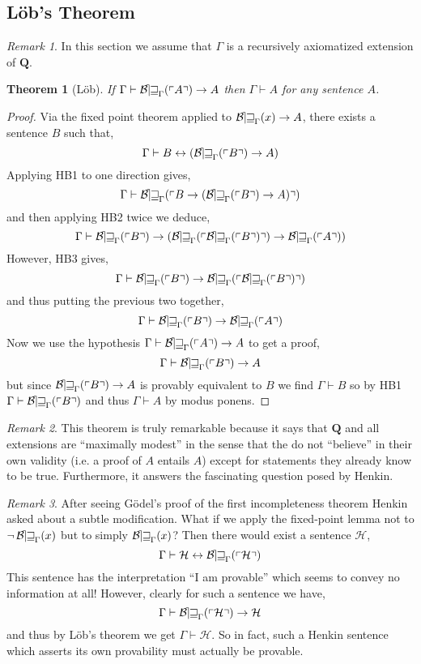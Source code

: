 \documentclass[12pt, leqno]{article}
\renewcommand{\bf}[1]{\mathbf{#1}}
\newcommand{\proves}{\vdash}
\theoremstyle{theorem}
\newtheorem{theorem}{Theorem}[section]
\theoremstyle{definition}
\theoremstyle{definition}
\theoremstyle{remark}
\theoremstyle{definition}
\theoremstyle{remark}
\newtheorem{remark}{Remark}[subsection]
\DeclareMathOperator{\Bew}{\mathcal{B\mkern-2.0mu e\mkern-2.0mu w\mkern-1mu}}
\begin{document}
\subsection{L\"{o}b's Theorem}

\begin{remark}
In this section we assume that $\Gamma$ is a recursively axiomatized extension of $\bf{Q}$. 
\end{remark}

\begin{theorem}[L\"{o}b]
If $\Gamma \proves \Thm{A} \to A$ then $\Gamma \proves A$ for any sentence $A$.
\end{theorem}

\begin{proof}
Via the fixed point theorem applied to $\Bew_{\Gamma}(x) \to A$, there exists a sentence $B$ such that,
\[ \Gamma \proves B \leftrightarrow (\Thm{B} \to A) \]
Applying HB1 to one direction gives,
\[ \Gamma \proves \Thm{B \to (\Thm{B} \to A)} \]
and then applying HB2 twice we deduce,
\[ \Gamma \proves \Thm{B} \to (\Thm{\Thm{B}} \to \Thm{A}) \]
However, HB3 gives, 
\[ \Gamma \proves \Thm{B} \to \Thm{\Thm{B}} \]
and thus putting the previous two together,
\[ \Gamma \proves \Thm{B} \to \Thm{A} \]
Now we use the hypothesis $\Gamma \proves \Thm{A} \to A$ to get a proof,
\[ \Gamma \proves \Thm{B} \to A \]
but since $\Thm{B} \to A$ is provably equivalent to $B$ we find $\Gamma \proves B$ so by HB1 $\Gamma \proves \Thm{B}$ and thus $\Gamma \proves A$ by modus ponens. 
\end{proof}

\begin{remark}
This theorem is truly remarkable because it says that $\bf{Q}$ and all extensions are ``maximally modest'' in the sense that the do not ``believe'' in their own validity (i.e. a proof of $A$ entails $A$) except for statements they already know to be true. Furthermore, it answers the fascinating question posed by Henkin. 
\end{remark}

\begin{remark}
After seeing G\"{o}del's proof of the first incompleteness theorem Henkin asked about a subtle modification. What if we apply the fixed-point lemma not to $\neg \Bew_{\Gamma}(x)$ but to simply $\Bew_{\Gamma}(x)$? Then there would exist a sentence $\mathcal{H}$,
\[ \Gamma \proves \mathcal{H} \leftrightarrow \Thm{\mathcal{H}} \]
This sentence has the interpretation ``I am provable'' which seems to convey no information at all! However, clearly for such a sentence we have,
\[ \Gamma \proves \Thm{\mathcal{H}} \to \mathcal{H} \]
and thus by L\"{o}b's theorem we get $\Gamma \proves \mathcal{H}$. So in fact, such a Henkin sentence which asserts its own provability must actually be provable.  
\end{remark}
\end{document}
